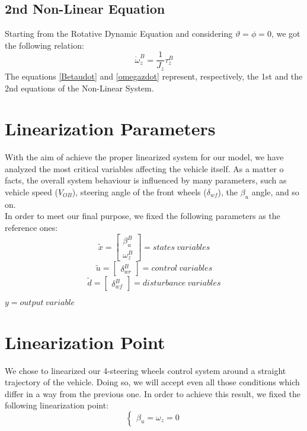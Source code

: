 \documentclass[a4paper,12pt,titlepage]{report}
\begin{document}
	\subsection{2nd Non-Linear Equation}
		Starting from the Rotative Dynamic Equation and considering $\vartheta = \phi = 0$, we got the following relation:
			\begin{equation} \label{omegazdot}
				\dot{\omega}_{z}^{B} = \frac{1}{J_{z}} \tau_{z}^{B}
			\end{equation}
		The equations \ref{Betaudot} and \ref{omegazdot} represent, respectively, the 1st and the 2nd equations of the Non-Linear System.
\section{Linearization Parameters} 
	With the aim of achieve the proper linearized system for our model, we have analyzed the most critical variables affecting the vehicle itself. As a matter o facts, the overall system behaviour is influenced by many parameters, such as vehicle speed ($V_{OB}$), steering angle of the front wheels ($\delta_{wf}$), the $\beta_{u}$ angle, and so on. \\
	In order to meet our final purpose, we fixed the following parameters as the reference ones:\\
		\begin{equation*}
			\tilde{x} =
			\begin{bmatrix}
			\beta_{u}^{B} \\\omega_{z}^{B}
			\end{bmatrix} = states \ variables
		\end{equation*}\quad
		\begin{equation*} 
			\tilde{u} =
			\begin{bmatrix}
			\delta_{wr}^{B} 
			\end{bmatrix} = control \ variables
		\end{equation*}\quad
		\begin{equation*} 
			\tilde{d} =
			\begin{bmatrix}
			\delta_{wf}^{B} 
			\end{bmatrix} = disturbance \ variables
		\end{equation*}
		\begin{center}
			$ y = output \ variable $	
		\end{center}
\section{Linearization Point} 
	We chose to linearized our 4-steering wheels control system around a straight trajectory of the vehicle. Doing so, we will accept even all those conditions which differ in a way from the previous one. In order to achieve this result, we fixed the following linearization point:
		\begin{equation*}
			\begin{cases}
				\beta_{u} = \omega_{z} = 0
			\end{cases}
		\end{equation*}
\end{document}
